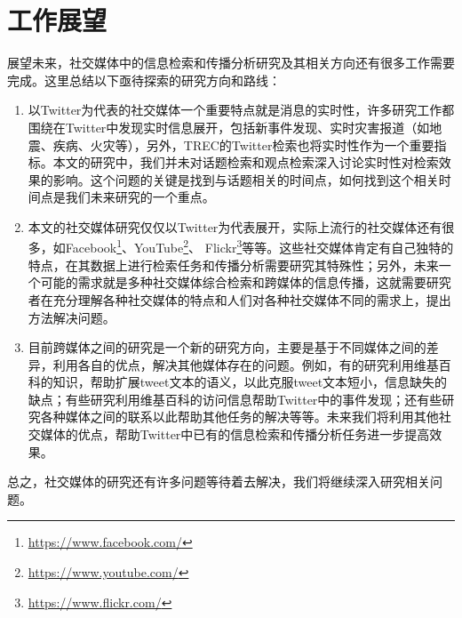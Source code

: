 \section{工作展望}
展望未来，社交媒体中的信息检索和传播分析研究及其相关方向还有很多工作需要完成。这里总结以下亟待探索的研究方向和路线：
  \begin{enumerate}
  \item 以Twitter为代表的社交媒体一个重要特点就是消息的实时性，许多研究工作都围绕在Twitter中发现实时信息展开，包括新事件发现、实时灾害报道（如地震、疾病、火灾等），另外，TREC的Twitter检索也将实时性作为一个重要指标。本文的研究中，我们并未对话题检索和观点检索深入讨论实时性对检索效果的影响。这个问题的关键是找到与话题相关的时间点，如何找到这个相关时间点是我们未来研究的一个重点。
  
 \item 本文的社交媒体研究仅仅以Twitter为代表展开，实际上流行的社交媒体还有很多，如Facebook\footnote{\url{https://www.facebook.com/}}、YouTube\footnote{\url{https://www.youtube.com/}}、 Flickr\footnote{\url{https://www.flickr.com/}}等等。这些社交媒体肯定有自己独特的特点，在其数据上进行检索任务和传播分析需要研究其特殊性；另外，未来一个可能的需求就是多种社交媒体综合检索和跨媒体的信息传播，这就需要研究者在充分理解各种社交媒体的特点和人们对各种社交媒体不同的需求上，提出方法解决问题。
 
 \item 目前跨媒体之间的研究是一个新的研究方向，主要是基于不同媒体之间的差异，利用各自的优点，解决其他媒体存在的问题。例如，有的研究利用维基百科的知识，帮助扩展tweet文本的语义，以此克服tweet文本短小，信息缺失的缺点；有些研究利用维基百科的访问信息帮助Twitter中的事件发现；还有些研究各种媒体之间的联系以此帮助其他任务的解决等等。未来我们将利用其他社交媒体的优点，帮助Twitter中已有的信息检索和传播分析任务进一步提高效果。  
  \end{enumerate}
  
  总之，社交媒体的研究还有许多问题等待着去解决，我们将继续深入研究相关问题。

